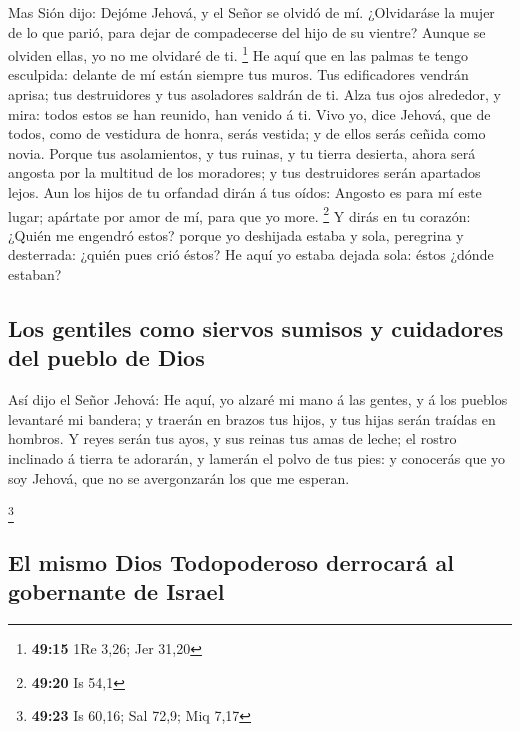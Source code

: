  Mas Sión dijo: Dejóme Jehová, y el Señor se olvidó de
mí.  ¿Olvidaráse la mujer de lo que parió, para dejar de
compadecerse del hijo de su vientre? Aunque se olviden ellas, yo no me
olvidaré de ti. \footnote{\textbf{49:15} 1Re 3,26; Jer 31,20}
 He aquí que en las palmas te tengo esculpida: delante de
mí están siempre tus muros.  Tus edificadores vendrán
aprisa; tus destruidores y tus asoladores saldrán de ti. 
Alza tus ojos alrededor, y mira: todos estos se han reunido, han venido
á ti. Vivo yo, dice Jehová, que de todos, como de vestidura de honra,
serás vestida; y de ellos serás ceñida como novia. 
Porque tus asolamientos, y tus ruinas, y tu tierra desierta, ahora será
angosta por la multitud de los moradores; y tus destruidores serán
apartados lejos.  Aun los hijos de tu orfandad dirán á
tus oídos: Angosto es para mí este lugar; apártate por amor de mí, para
que yo more. \footnote{\textbf{49:20} Is 54,1}  Y dirás
en tu corazón: ¿Quién me engendró estos? porque yo deshijada estaba y
sola, peregrina y desterrada: ¿quién pues crió éstos? He aquí yo estaba
dejada sola: éstos ¿dónde estaban?

\hypertarget{los-gentiles-como-siervos-sumisos-y-cuidadores-del-pueblo-de-dios}{%
\subsection{Los gentiles como siervos sumisos y cuidadores del pueblo de
Dios}\label{los-gentiles-como-siervos-sumisos-y-cuidadores-del-pueblo-de-dios}}

 Así dijo el Señor Jehová: He aquí, yo alzaré mi mano á
las gentes, y á los pueblos levantaré mi bandera; y traerán en brazos
tus hijos, y tus hijas serán traídas en hombros.  Y reyes
serán tus ayos, y sus reinas tus amas de leche; el rostro inclinado á
tierra te adorarán, y lamerán el polvo de tus pies: y conocerás que yo
soy Jehová, que no se avergonzarán los que me esperan.

\footnote{\textbf{49:23} Is 60,16; Sal 72,9; Miq 7,17}

\hypertarget{el-mismo-dios-todopoderoso-derrocaruxe1-al-gobernante-de-israel}{%
\subsection{El mismo Dios Todopoderoso derrocará al gobernante de
Israel}\label{el-mismo-dios-todopoderoso-derrocaruxe1-al-gobernante-de-israel}}

